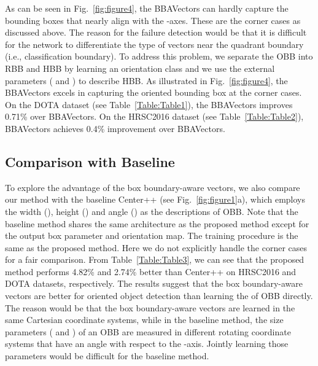 \documentclass[10pt,twocolumn,letterpaper]{article}
\begin{document}
As can be seen in Fig.~\ref{fig:figure4}, the BBAVectors can hardly capture the bounding boxes that nearly align with the -axes. These are the corner cases as discussed above. The reason for the failure detection would be that it is difficult for the network to differentiate the type of vectors near the quadrant boundary (i.e., classification boundary). To address this problem, we separate the OBB into RBB and HBB by learning an orientation class  and we use the external parameters ( and ) to describe HBB. As illustrated in Fig.~\ref{fig:figure4}, the BBAVectors excels in capturing the oriented bounding box at the corner cases. On the DOTA dataset (see Table~\ref{Table:Table1}), the BBAVectors improves 0.71\% over BBAVectors. On the HRSC2016 dataset (see Table~\ref{Table:Table2}), BBAVectors achieves 0.4\% improvement over BBAVectors. 


\subsection{Comparison with Baseline}
To explore the advantage of the box boundary-aware vectors, we also compare our method with the baseline Center++ (see Fig.~\ref{fig:figure1}a), which employs the width (), height () and angle () as the descriptions of OBB. Note that the baseline method shares the same architecture as the proposed method except for the output box parameter and orientation map. The training procedure is the same as the proposed method. Here we do not explicitly handle the corner cases for a fair comparison. From Table~\ref{Table:Table3}, we can see that the proposed method performs 4.82\% and 2.74\% better than Center++ on HRSC2016 and DOTA datasets, respectively. The results suggest that the box boundary-aware vectors are better for oriented object detection than learning the  of OBB directly. The reason would be that the box boundary-aware vectors are learned in the same Cartesian coordinate systems, while in the baseline method, the size parameters ( and ) of an OBB are measured in different rotating coordinate systems that have an angle  with respect to the -axis. Jointly learning those parameters would be difficult for the baseline method.


\begin{table}
\begin{center}
\end{center}
\caption{Comparison between baseline method Center++ and the proposed method BAVectors. }
\label{Table:Table3}
\end{table}
\end{document}
